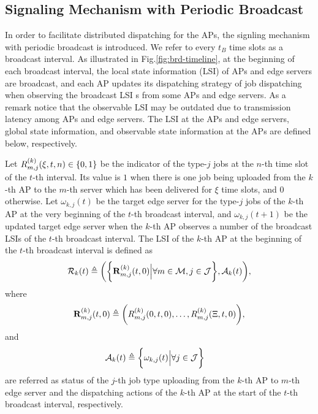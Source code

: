 \subsection{{Signaling Mechanism with Periodic Broadcast}}
\label{subsec:broadcast}
In order to facilitate distributed dispatching for the APs, {the signling mechanism with periodic broadcast is introduced.}
We refer to every $t_B$ time slots as a broadcast interval.
As illustrated in Fig.\ref{fig:brd-timeline}, at the beginning of each broadcast interval, the local state information (LSI) of APs and edge servers are broadcast, and each AP updates its dispatching strategy of job dispatching when observing the broadcast LSI s from some APs and edge servers.
As a remark notice that the observable LSI may be outdated due to transmission latency among APs and edge servers.
The LSI at the APs and edge servers, global state information, and observable state information at the APs are defined below, respectively.

\begin{definition}
    Let $R^{(k)}_{m,j}(\xi,t,n) \in \{0,1\}$ be the indicator of the type-$j$ jobs at the $n$-th time slot of the $t$-th interval.
    Its value is $1$ when there is one job being uploaded from the $k$-th AP to the $m$-th server which has been delivered for $\xi$ time slots, and $0$ otherwise.
    Let $\omega_{k,j}(t)$ be the target edge server for the type-$j$ jobs of the $k$-th AP at the very beginning of the $t$-th broadcast interval, and $\omega_{k,j}(t+1)$ be the updated target edge server when the $k$-th AP observes a number of the broadcast LSIs of the $t$-th broadcast interval.
    The LSI of the $k$-th AP at the beginning of the $t$-th broadcast interval is defined as
    {\small
    \begin{align}
        \mathcal{R}_{k}(t) \triangleq
        \bigg(
            \bigg\{\mathbf{R}^{(k)}_{m,j}(t,0) \Big| \forall m\in\mathcal{M},j\in\mathcal{J}\bigg\},
            \mathcal{A}_{k}(t)
        \bigg),
    \end{align}
    }
    where
    \begin{align}
        \mathbf{R}^{(k)}_{m,j}(t,0) \triangleq \bigg(
            R^{(k)}_{m,j}(0,t,0), \dots, R^{(k)}_{m,j}(\Xi,t,0)
        \bigg),
    \end{align}
    and
    \begin{align}
        \mathcal{A}_{k}(t) &\triangleq \bigg\{\omega_{k,j}(t) \Big| \forall j\in\mathcal{J}\bigg\}
    \end{align}
    are referred as status of the $j$-th job type uploading from the $k$-th AP to $m$-th edge server and the dispatching actions of the $k$-th AP at the start of the $t$-th broadcast interval, respectively.
\end{definition}

